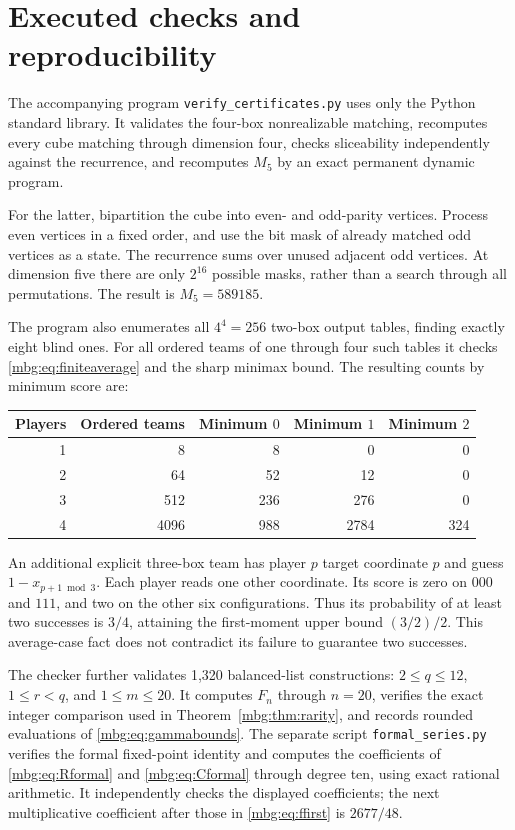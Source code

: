\documentclass[11pt,letterpaper]{article}
\theoremstyle{definition}
\begin{document}
\section{Executed checks and reproducibility}
\label{mbg:sec:checks}

The accompanying program \texttt{verify\_certificates.py} uses only the Python standard library. It validates the four-box nonrealizable matching, recomputes every cube matching through dimension four, checks sliceability independently against the recurrence, and recomputes $M_5$ by an exact permanent dynamic program.

For the latter, bipartition the cube into even- and odd-parity vertices. Process even vertices in a fixed order, and use the bit mask of already matched odd vertices as a state. The recurrence sums over unused adjacent odd vertices. At dimension five there are only $2^{16}$ possible masks, rather than a search through all permutations. The result is $M_5=589185$.

The program also enumerates all $4^4=256$ two-box output tables, finding exactly eight blind ones. For all ordered teams of one through four such tables it checks \eqref{mbg:eq:finiteaverage} and the sharp minimax bound. The resulting counts by minimum score are:
\begin{center}
\begin{tabular}{rrrrr}
\toprule
Players & Ordered teams & Minimum $0$ & Minimum $1$ & Minimum $2$\\
\midrule
1 & 8 & 8 & 0 & 0\\
2 & 64 & 52 & 12 & 0\\
3 & 512 & 236 & 276 & 0\\
4 & 4096 & 988 & 2784 & 324\\
\bottomrule
\end{tabular}
\end{center}

An additional explicit three-box team has player $p$ target coordinate $p$ and guess $1-x_{p+1\bmod3}$. Each player reads one other coordinate. Its score is zero on $000$ and $111$, and two on the other six configurations. Thus its probability of at least two successes is $3/4$, attaining the first-moment upper bound $(3/2)/2$. This average-case fact does not contradict its failure to guarantee two successes.

The checker further validates 1,320 balanced-list constructions: $2\le q\le12$, $1\le r<q$, and $1\le m\le20$. It computes $F_n$ through $n=20$, verifies the exact integer comparison used in Theorem~\ref{mbg:thm:rarity}, and records rounded evaluations of \eqref{mbg:eq:gammabounds}. The separate script \texttt{formal\_series.py} verifies the formal fixed-point identity and computes the coefficients of \eqref{mbg:eq:Rformal} and \eqref{mbg:eq:Cformal} through degree ten, using exact rational arithmetic. It independently checks the displayed coefficients; the next multiplicative coefficient after those in \eqref{mbg:eq:ffirst} is $2677/48$.
\end{document}
